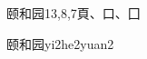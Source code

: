 \begin{entry}{颐和园}{13,8,7}{⾴、⼝、⼞}
  \begin{phonetics}{颐和园}{yi2he2yuan2}
  \end{phonetics}
\end{entry}
